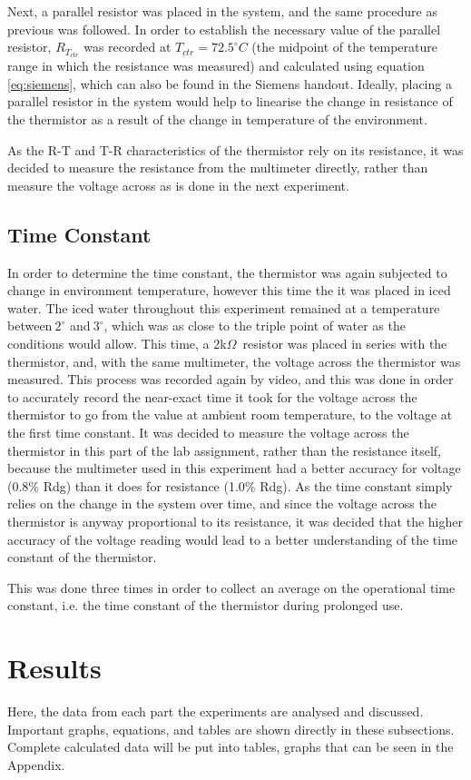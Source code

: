 \documentclass[a4,11pt]{article}
\begin{document}
Next, a parallel resistor was placed in the system, and the same procedure as previous was followed. In order to establish the necessary value of the parallel resistor, $R_{T_{ctr}}$ was recorded at $T_{ctr}=72.5^{\circ}C$ (the midpoint of the temperature range in which the resistance was measured) and calculated using equation \ref{eq:siemens}, which can also be found in the Siemens handout. Ideally, placing a parallel resistor in the system would help to linearise the change in resistance of the thermistor as a result of the change in temperature of the environment.

As the R-T and T-R characteristics of the thermistor rely on its resistance, it was decided to measure the resistance from the multimeter directly, rather than measure the voltage across as is done in the next experiment.
\subsection{Time Constant}
In order to determine the time constant, the thermistor was again subjected to change in environment temperature, however this time the it was placed in iced water. The iced water throughout this experiment remained at a temperature between$~2^{\circ}$ and$~3^{\circ}$, which was as close to the triple point of water as the conditions would allow. This time, a 2k$\Omega$\ resistor was placed in series with the thermistor, and, with the same multimeter, the voltage across the thermistor was measured. This process was recorded again by video, and this was done in order to accurately record the near-exact time it took for the voltage across the thermistor to go from the value at ambient room temperature, to the voltage at the first time constant. It was decided to measure the voltage across the thermistor in this part of the lab assignment, rather than the resistance itself, because the multimeter used in this experiment had a better accuracy for voltage (0.8\% Rdg) than it does for resistance (1.0\% Rdg). As the time constant simply relies on the change in the system over time, and since the voltage across the thermistor is anyway proportional to its resistance, it was decided that the higher accuracy of the voltage reading would lead to a better understanding of the time constant of the thermistor.

This was done three times in order to collect an average on the operational time constant, i.e. the time constant of the thermistor during prolonged use.
\section{Results}
Here, the data from each part the experiments are analysed and discussed. Important graphs, equations, and tables are shown directly in these subsections. Complete calculated data will be put into tables, graphs that can be seen in the Appendix.
\end{document}
